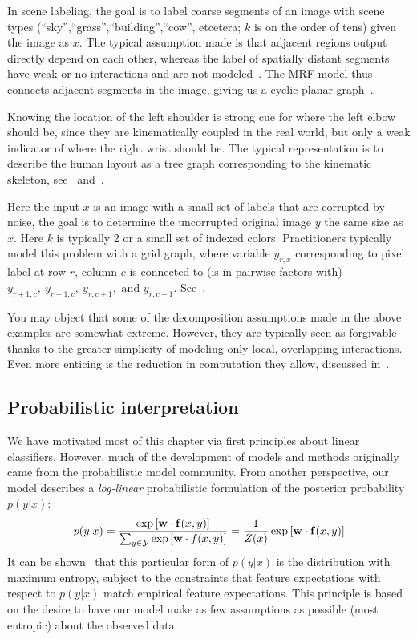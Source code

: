  In scene labeling, the goal is to label coarse segments 
of an image with scene types (``sky'',``grass'',``building'',``cow'', etcetera; 
$k$ is on the order of tens) given the image as $x$. The typical assumption 
made is that adjacent regions output directly depend on each other, whereas the 
label of spatially distant segments have weak or no interactions and are not 
modeled~\citep{cour05}.  The MRF model thus connects adjacent segments in the 
image, giving us a cyclic planar graph~.

  Knowing the location of the left shoulder is 
strong cue for where the left elbow should be, since they are kinematically 
coupled in the real world, but only a weak indicator of where the right wrist 
should be.  The typical representation is to describe the human layout as a 
tree graph corresponding to the kinematic skeleton, 
see~ and~.


 Here the input $x$ is an image with a small set of 
labels that are corrupted by noise, the goal is to determine the uncorrupted 
original image $y$ the same size as $x$.  Here $k$ is typically 2 or a small 
set of indexed colors. Practitioners typically model this problem with a grid 
graph, where variable $y_{r,x}$ corresponding to pixel label at row $r$, column 
$c$ is connected to (is in pairwise factors with) 
$y_{r+1,c},~y_{r-1,c},~y_{r,c+1}, \text{ and } y_{r,c-1}$.  
See~.

You may object that some of the decomposition assumptions made in the above 
examples are somewhat extreme.  However, they are typically seen as forgivable 
thanks to the greater simplicity of modeling only local, overlapping 
interactions. Even more enticing is the reduction in computation they allow, 
discussed in~.

\subsection{Probabilistic interpretation}\label{sec:probinterp}

We have motivated most of this chapter via first principles about linear classifiers.  However, much of the development of models and methods originally came from the probabilistic model community.  From another perspective, our model describes a {\em log-linear} probabilistic formulation of the posterior probability $p(y|x)$:
\begin{equation}
p(y|x)= \frac{\exp \left[ \mathbf{w} \cdot \mathbf{f}(x,y) \right]}{\sum_{y \in \mathcal{Y}} \exp \left[\mathbf{w} \cdot f(x,y) \right]} = \frac{1}{Z(x)} \exp \left[ \mathbf{w} \cdot \mathbf{f}(x,y) \right]
\end{equation}
It can be shown~\citep{jaynes1963} that this particular form of $p(y|x)$ is the
distribution with maximum entropy, subject to the constraints that feature 
expectations with respect to $p(y|x)$ match empirical feature expectations.  
This principle is based on the desire to have our model make as few assumptions 
as possible (most entropic) about the observed data.


